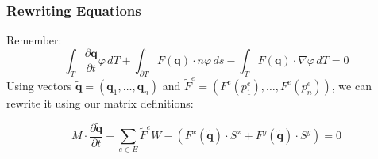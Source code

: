\documentclass{beamer}
\newcommand{\pd}[2]{\dfrac{\partial #1}{\partial #2}}
\renewcommand{\phi}{\varphi}
\begin{document}
\begin{frame}
  \frametitle{Rewriting Equations}
  Remember:
  \begin{equation*}
    \int_T \pd {\mathbf{q}}{t} \phi \, dT +
    \int_{\partial T} F\left(\mathbf{q}\right) \cdot n \phi \, ds -
    \int_T F(\mathbf{q}) \cdot \nabla \phi \, dT = 0
  \end{equation*}
  Using vectors $\tilde{\mathbf{q}} = (\mathbf{q}_1,\dots,\mathbf{q}_n)$ and $\tilde{F}^e=(F^e(p_1^e),\dots,F^e(p_n^e))$, we can rewrite it using our matrix definitions:
  
  \begin{equation*}
    M \cdot \pd{\tilde{\mathbf{q}}}{t} +
    \sum_{e \in E} \tilde{F}^e W -
    \left(F^x(\tilde{\mathbf{q}}) \cdot S^x +
      F^y(\tilde{\mathbf{q}}) \cdot S^y\right) = 0
  \end{equation*}
\end{frame}
\end{document}
